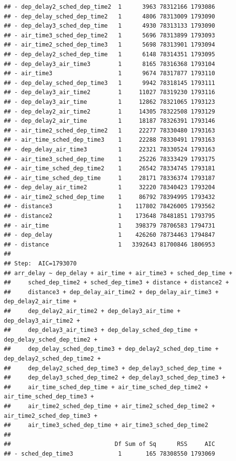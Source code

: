 \documentclass[
]{article}
\begin{document}
\begin{verbatim}
## - dep_delay2_sched_dep_time2  1      3963 78312166 1793086
## - dep_delay_sched_dep_time2   1      4806 78313009 1793090
## - dep_delay3_sched_dep_time   1      4930 78313133 1793090
## - air_time3_sched_dep_time2   1      5696 78313899 1793093
## - air_time2_sched_dep_time3   1      5698 78313901 1793094
## - dep_delay2_sched_dep_time   1      6148 78314351 1793095
## - dep_delay3_air_time3        1      8165 78316368 1793104
## - air_time3                   1      9674 78317877 1793110
## - dep_delay_sched_dep_time3   1      9942 78318145 1793111
## - dep_delay3_air_time2        1     11027 78319230 1793116
## - dep_delay3_air_time         1     12862 78321065 1793123
## - dep_delay2_air_time2        1     14305 78322508 1793129
## - dep_delay2_air_time         1     18187 78326391 1793146
## - air_time2_sched_dep_time2   1     22277 78330480 1793163
## - air_time_sched_dep_time3    1     22288 78330491 1793163
## - dep_delay_air_time3         1     22321 78330524 1793163
## - air_time3_sched_dep_time    1     25226 78333429 1793175
## - air_time_sched_dep_time2    1     26542 78334745 1793181
## - air_time_sched_dep_time     1     28171 78336374 1793187
## - dep_delay_air_time2         1     32220 78340423 1793204
## - air_time2_sched_dep_time    1     86792 78394995 1793432
## - distance3                   1    117802 78426005 1793562
## - distance2                   1    173648 78481851 1793795
## - air_time                    1    398379 78706583 1794731
## - dep_delay                   1    426260 78734463 1794847
## - distance                    1   3392643 81700846 1806953
## 
## Step:  AIC=1793070
## arr_delay ~ dep_delay + air_time + air_time3 + sched_dep_time + 
##     sched_dep_time2 + sched_dep_time3 + distance + distance2 + 
##     distance3 + dep_delay_air_time2 + dep_delay_air_time3 + dep_delay2_air_time + 
##     dep_delay2_air_time2 + dep_delay3_air_time + dep_delay3_air_time2 + 
##     dep_delay3_air_time3 + dep_delay_sched_dep_time + dep_delay_sched_dep_time2 + 
##     dep_delay_sched_dep_time3 + dep_delay2_sched_dep_time + dep_delay2_sched_dep_time2 + 
##     dep_delay2_sched_dep_time3 + dep_delay3_sched_dep_time + 
##     dep_delay3_sched_dep_time2 + dep_delay3_sched_dep_time3 + 
##     air_time_sched_dep_time + air_time_sched_dep_time2 + air_time_sched_dep_time3 + 
##     air_time2_sched_dep_time + air_time2_sched_dep_time2 + air_time2_sched_dep_time3 + 
##     air_time3_sched_dep_time + air_time3_sched_dep_time2
## 
##                              Df Sum of Sq      RSS     AIC
## - sched_dep_time3             1       165 78308550 1793069

\end{verbatim}
\end{document}
